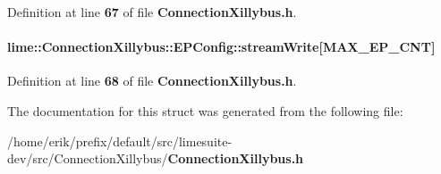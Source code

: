Definition at line {\bf 67} of file {\bf Connection\+Xillybus.\+h}.

\paragraph[{stream\+Write}]{ lime\+::\+Connection\+Xillybus\+::\+E\+P\+Config\+::stream\+Write[{\bf M\+A\+X\+\_\+\+E\+P\+\_\+\+C\+NT}]}\label{structlime_1_1ConnectionXillybus_1_1EPConfig_ac127e545f6bad7602e93a5838bfba9da}


Definition at line {\bf 68} of file {\bf Connection\+Xillybus.\+h}.



The documentation for this struct was generated from the following file\+:\begin{DoxyCompactItemize}
\item 
/home/erik/prefix/default/src/limesuite-\/dev/src/\+Connection\+Xillybus/{\bf Connection\+Xillybus.\+h}\end{DoxyCompactItemize}
